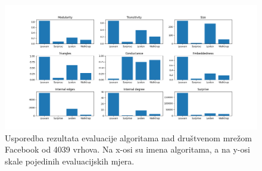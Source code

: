\begin{figure}
	\includegraphics[width=\linewidth]{images/facebook1.png}
	\caption{Usporedba rezultata evaluacije algoritama nad društvenom mrežom Facebook od 4039 vrhova. Na x-osi su imena algoritama, a na y-osi skale pojedinih evaluacijskih mjera.}
	\label{fig:facebook_res}
\end{figure}